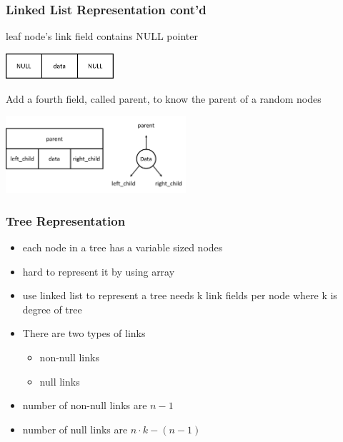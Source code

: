 \documentclass[newPxFont,sthlmFooter,nooffset]{beamer}
\begin{document}
\begin{frame}[t]
  \frametitle{Linked List Representation cont'd}
leaf node's link field contains NULL pointer

  \begin{center}
\vspace{-1em}
    \includegraphics[width=0.3\textwidth]{figures/fig08_linked_list2.png}
  \end{center}

Add a fourth field, called parent, to know the parent of a random nodes
  \begin{center}
\vspace{-1em}
    \includegraphics[width=0.5\textwidth]{figures/fig08_linked_list1.png}
  \end{center}

\end{frame}



\begin{frame}[t]
  \frametitle{Tree Representation}
  \begin{itemize}
  \item each node in a tree has a variable sized nodes
  \item hard to represent it by using array
  \item use linked list to represent a tree needs k link fields per node where k is degree of tree
  \item There are two types of links
    \begin{itemize}
    \item non-null links
    \item null links
    \end{itemize}
  \item number of non-null links are $n-1$
  \item number of null links are $n \cdot k - (n-1)$
  \end{itemize}
\end{frame}
\end{document}

